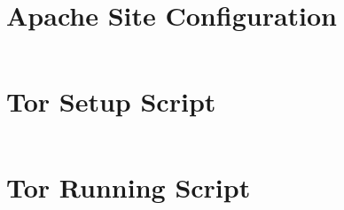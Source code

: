 \documentclass{ecuthesis}
\begin{document}
\section{Apache Site Configuration}
\inputminted{apacheconf}{../experiment/simulation/site/000-default-ssl}

\section{Tor Setup Script}
\inputminted{bash}{../experiment/simulation/tor/make_private_network.sh}

\section{Tor Running Script}
\inputminted{bash}{../experiment/simulation/tor/run_private_network.sh}

\printbibliography[title=REFERENCES]
\end{document}
